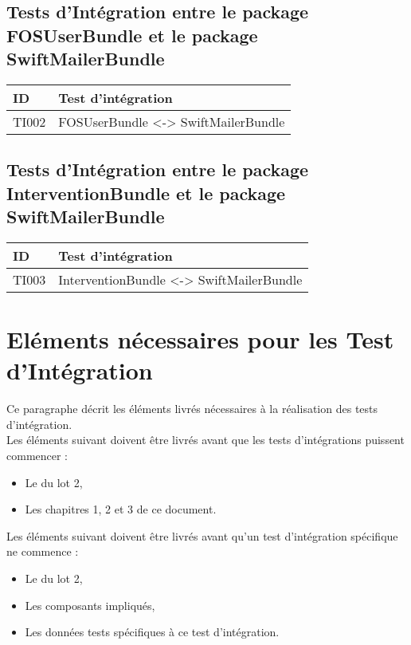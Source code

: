   	
  	\subsection*{Tests d'Intégration entre le package FOSUserBundle et le package SwiftMailerBundle}
 	
 	\begin{center}
    		\begin{tabular}[h]{|p{}|p{}|}
		\hline
			ID & Test d'intégration \\\hline
			TI002 & FOSUserBundle <-> SwiftMailerBundle \\\hline
    	 	\end{tabular}
  	\end{center}
  	
  	\subsection*{Tests d'Intégration entre le package InterventionBundle et le package SwiftMailerBundle}
 	
 	\begin{center}
    		\begin{tabular}[h]{|p{}|p{}|}
		\hline
			ID & Test d'intégration \\\hline
			TI003 & InterventionBundle <-> SwiftMailerBundle \\\hline
    	 	\end{tabular}
  	\end{center}
  	
  	
  	
 	
  \section{Eléments nécessaires pour les Test d'Intégration}
  	Ce paragraphe décrit les éléments livrés nécessaires à la réalisation des tests d'intégration. \\
  	
  	Les éléments suivant doivent être livrés avant que les tests d'intégrations puissent commencer :
  	\begin{itemize}
  		\item Le \PTU du lot 2,
  		\item Les chapitres 1, 2 et 3 de ce document.
  	\end{itemize}
  	
  	Les éléments suivant doivent être livrés avant qu'un test d'intégration spécifique ne commence :
  	\begin{itemize}
  		\item Le \JTU du lot 2,
  		\item Les composants impliqués,
  		\item Les données tests spécifiques à ce test d'intégration.
  	\end{itemize}
  
